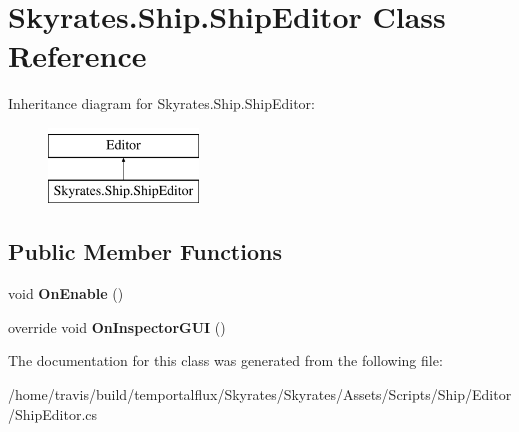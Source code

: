 \hypertarget{class_skyrates_1_1_ship_1_1_ship_editor}{\section{Skyrates.\-Ship.\-Ship\-Editor Class Reference}
\label{class_skyrates_1_1_ship_1_1_ship_editor}
}
Inheritance diagram for Skyrates.\-Ship.\-Ship\-Editor\-:\begin{figure}[H]
\begin{center}
\leavevmode
\includegraphics[height=2.000000cm]{class_skyrates_1_1_ship_1_1_ship_editor}
\end{center}
\end{figure}
\subsection*{Public Member Functions}
\begin{DoxyCompactItemize}
\item 
\hypertarget{class_skyrates_1_1_ship_1_1_ship_editor_a2052a47cf463b60d11af107dd117e5ce}{void {\bfseries On\-Enable} ()}\label{class_skyrates_1_1_ship_1_1_ship_editor_a2052a47cf463b60d11af107dd117e5ce}

\item 
\hypertarget{class_skyrates_1_1_ship_1_1_ship_editor_a660d3145f80ec0535c56c90f9abbd91e}{override void {\bfseries On\-Inspector\-G\-U\-I} ()}\label{class_skyrates_1_1_ship_1_1_ship_editor_a660d3145f80ec0535c56c90f9abbd91e}

\end{DoxyCompactItemize}


The documentation for this class was generated from the following file\-:\begin{DoxyCompactItemize}
\item 
/home/travis/build/temportalflux/\-Skyrates/\-Skyrates/\-Assets/\-Scripts/\-Ship/\-Editor/Ship\-Editor.\-cs\end{DoxyCompactItemize}
